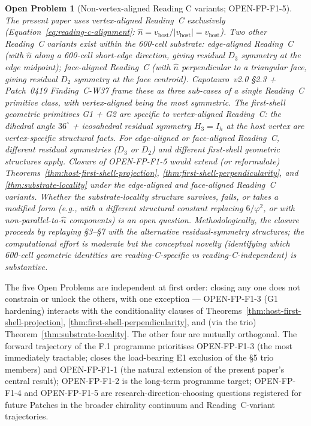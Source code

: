 \documentclass[11pt,letterpaper]{article}
\newtheorem{openproblem}{Open Problem}
\newcommand{\phig}{\varphi}
\newcommand{\vhost}{v_{\text{host}}}
\begin{document}
\begin{openproblem}[Non-vertex-aligned Reading C variants; OPEN-FP-F1-5]
\label{op:non-vertex-aligned-c}
The present paper uses \emph{vertex-aligned Reading~C} exclusively (Equation~\eqref{eq:reading-c-alignment}: $\hat{n} = \vhost / |\vhost| = \vhost$). Two other Reading~C variants exist within the 600-cell substrate: \emph{edge-aligned Reading~C} (with $\hat{n}$ along a 600-cell short-edge direction, giving residual $D_3$ symmetry at the edge midpoint); \emph{face-aligned Reading~C} (with $\hat{n}$ perpendicular to a triangular face, giving residual $D_2$ symmetry at the face centroid). Capotauro~v2.0 §2.3 + Patch~0419 Finding~C-W37 frame these as three sub-cases of a single Reading~C primitive class, with vertex-aligned being the most symmetric. The first-shell geometric primitives G1 + G2 are specific to vertex-aligned Reading~C: the dihedral angle $36^\circ$ + icosahedral residual symmetry $H_3 = I_h$ at the host vertex are vertex-specific structural facts. For edge-aligned or face-aligned Reading~C, different residual symmetries ($D_3$ or $D_2$) and different first-shell geometric structures apply. Closure of OPEN-FP-F1-5 would extend (or reformulate) Theorems~\ref{thm:host-first-shell-projection}, \ref{thm:first-shell-perpendicularity}, and \ref{thm:substrate-locality} under the edge-aligned and face-aligned Reading~C variants. Whether the substrate-locality structure survives, fails, or takes a modified form (e.g., with a different structural constant replacing $6/\phig^2$, or with non-parallel-to-$\hat{n}$ components) is an open question. Methodologically, the closure proceeds by replaying §3--§7 with the alternative residual-symmetry structures; the computational effort is moderate but the conceptual novelty (identifying which 600-cell geometric identities are reading-C-specific vs reading-C-independent) is substantive.
\end{openproblem}

The five Open Problems are independent at first order: closing any one does not constrain or unlock the others, with one exception --- OPEN-FP-F1-3 (G1 hardening) interacts with the conditionality clauses of Theorems~\ref{thm:host-first-shell-projection}, \ref{thm:first-shell-perpendicularity}, and (via the trio) Theorem~\ref{thm:substrate-locality}. The other four are mutually orthogonal. The forward trajectory of the F.1 programme prioritises OPEN-FP-F1-3 (the most immediately tractable; closes the load-bearing E1 exclusion of the §5 trio members) and OPEN-FP-F1-1 (the natural extension of the present paper's central result); OPEN-FP-F1-2 is the long-term programme target; OPEN-FP-F1-4 and OPEN-FP-F1-5 are research-direction-choosing questions registered for future Patches in the broader chirality continuum and Reading~C-variant trajectories.
\end{document}
